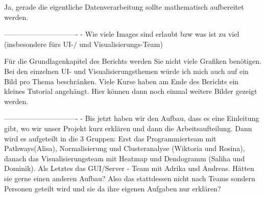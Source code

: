 Ja, gerade die eigentliche Datenverarbeitung sollte mathematisch aufbereitet werden.

-------------------------------
- Wie viele Images sind erlaubt bzw was ist zu viel (insbesondere fürs UI-/ und Visualisierungs-Team)

Für die Grundlagenkapitel des Berichts werden Sie nicht viele Grafiken benötigen.
Bei den einzelnen UI- und Visualisierungsthemen würde ich mich auch auf ein Bild pro Thema beschränken.
Viele Kurse haben am Ende des Berichts ein kleines Tutorial angehängt.
Hier können dann noch einmal weitere Bilder gezeigt werden.

-------------------------------
- Bis jetzt haben wir den Aufbau, dass es eine Einleitung gibt, wo wir unser Projekt kurz erklären und dann die Arbeitsaufteilung. 
  Dann wird es aufgeteilt in die 3 Gruppen: Erst das Programmierteam mit Pathways(Alisa), Normalisierung und Clusteranalyse (Wiktoria und Rosina), danach das Visualisierungsteam mit Heatmap und Dendogramm (Saliha und Dominik). 
  Als Letztes das GUI/Server - Team mit Adrika und Andreas. Hätten sie gerne einen anderen Aufbau? Also das stattdessen nicht nach Teams sondern Personen geteilt wird und sie da ihre eigenen Aufgaben nur erklären?




  
